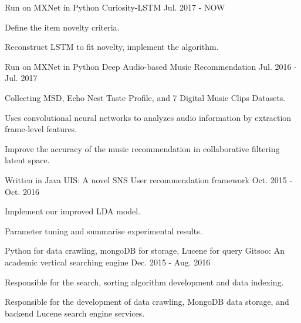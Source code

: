 \begin{cventries}
  \cventry
    {Run on MXNet in Python}
    {Curiosity-LSTM}
    {}
    {Jul. 2017 - NOW}
    {
      \begin{cvitems}
        \item {Define the item novelty criteria.}
        \item {Reconstruct LSTM to fit novelty, implement the algorithm.}
      \end{cvitems}
    }
  \cventry
    {Run on MXNet in Python}
    {Deep Audio-based Music Recommendation}
    {}
    {Jul. 2016 - Jul. 2017}
    {
      \begin{cvitems}
        \item {Collecting MSD, Echo Nest Taste Profile, and 7 Digital Music Clips Datasets.}
        \item {Uses convolutional neural networks to analyzes audio information by extraction frame-level features.}
        \item {Improve the accuracy of the music recommendation in collaborative filtering latent space.}
      \end{cvitems}
    }
  \cventry
    {Written in Java}
    {UIS: A novel SNS User recommendation framework}
    {}
    {Oct. 2015 - Oct. 2016}
    {
      \begin{cvitems}
        \item {Implement our improved LDA model.}
        \item {Parameter tuning and summarise experimental results.}
      \end{cvitems}
    }
  \cventry
    {Python for data crawling, mongoDB for storage, Lucene for query}
    {Gitsoo: An academic vertical searching engine}
    {}
    {Dec. 2015 - Aug. 2016}
    {
      \begin{cvitems}
        \item {Responsible for the search, sorting algorithm development and data indexing.}
        \item {Responsible for the development of data crawling, MongoDB data storage, and backend Lucene search engine services.}
      \end{cvitems}
    }
\end{cventries}